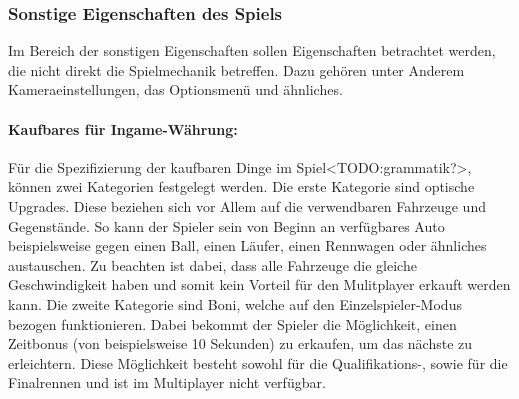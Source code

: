 	\subsubsection{Sonstige Eigenschaften des Spiels}
	Im Bereich der sonstigen Eigenschaften sollen Eigenschaften betrachtet werden, die nicht direkt die Spielmechanik betreffen. Dazu gehören unter Anderem Kameraeinstellungen, das Optionsmenü und ähnliches.

		\paragraph{Kaufbares für Ingame-Währung:}
		Für die Spezifizierung der kaufbaren Dinge im Spiel<TODO:grammatik?>, können zwei Kategorien festgelegt werden. Die erste Kategorie sind optische Upgrades. Diese beziehen sich vor Allem auf die verwendbaren Fahrzeuge und Gegenstände. So kann der Spieler sein von Beginn an verfügbares Auto beispielsweise gegen einen Ball, einen Läufer, einen Rennwagen oder ähnliches austauschen. Zu beachten ist dabei, dass alle Fahrzeuge die gleiche Geschwindigkeit haben und somit kein Vorteil für den Mulitplayer erkauft werden kann. Die zweite Kategorie sind Boni, welche auf den Einzelspieler-Modus bezogen funktionieren. Dabei bekommt der Spieler die Möglichkeit, einen Zeitbonus (von beispielsweise 10 Sekunden) zu erkaufen, um das nächste zu erleichtern. Diese Möglichkeit besteht sowohl für die Qualifikations-, sowie für die Finalrennen und ist im Multiplayer nicht verfügbar.


